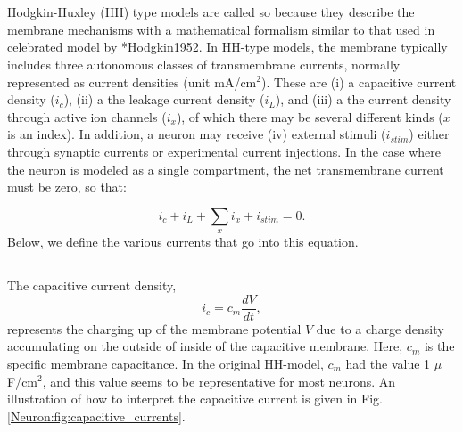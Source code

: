 \section{}
\label{sec:Neuron:membranecurrents}
Hodgkin-Huxley (HH) type models are called so because they describe the membrane mechanisms with a mathematical formalism similar to that used in celebrated model by \citeasnoun**{Hodgkin1952}. In HH-type models, the membrane typically includes three autonomous classes of transmembrane currents, normally represented as current densities (unit mA/cm$^2$). These are (i) a capacitive current density ($i_c$), (ii) a the leakage current density ($i_L$), and (iii) a the current density through active ion channels ($i_x$), of which there may be several different kinds ($x$ is an index). In addition, a neuron may receive  (iv) external stimuli ($i_{stim}$) either through synaptic currents or experimental current injections. In the case where the neuron is modeled as a single compartment, the net transmembrane current must be zero, so that:

\begin{equation}
i_c + i_L + \sum_x{i_x} +  i_{stim} = 0.
\label{Neuron:eq:singlecomp_zerosum}
\end{equation}
Below, we define the various currents that go into this equation.


\subsection{}
\label{sec:Neuron:Cap}

The capacitive current density,
\begin{equation}
i_c = c_m \frac{dV}{dt},
\label{Neuron:eq:HHcap}
\end{equation}
represents the charging up of the membrane potential $V$ due to a charge density accumulating on the outside of inside of the capacitive membrane. Here, $c_m$ is the specific membrane capacitance. In the original HH-model, $c_m$ had the value
1 $\mu$F/cm$^2$, and this value seems to be representative for most neurons.  An illustration of how to interpret the capacitive current is given in Fig. \ref{Neuron:fig:capacitive_currents}. 

